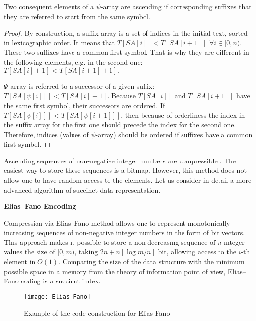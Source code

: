 \begin{theorem}
 \label{lemma:1}
 Two consequent elements of a $\psi$-array are ascending if corresponding suffixes that they are referred to
 start from the same symbol.
\end{theorem}

\begin{proof}
    By construction, a suffix array is a set of indices in the initial text,
    sorted in lexicographic order. It means that $T[SA[i]] < T[SA[i + 1]]$
    $\forall i \in [0, n).$ These two suffixes have a common first symbol.
    That is why they are different in the following elements, e.g. in the second one:
    $T[SA[i] + 1] < T[SA[i + 1] + 1].$

    $\Psi$-array is referred to a successor of a given suffix: $T[SA[\psi[i]]] < T[SA[i] + 1].$
    Because $T[SA[i]]$ and $T[SA[i + 1]]$ have the same first symbol, their successors are ordered.
    If $T[SA[\psi[i]]] < T[SA[\psi[i + 1]]]$, then because of orderliness the index in the suffix array
    for the first one should precede the index for the second one. Therefore, indices (values of $\psi$-array)
    should be ordered if suffixes have a common first symbol.
\end{proof}

Ascending sequences of non-negative integer numbers are compressible \cite{andersensimple}.
The easiest way to store these sequences is a bitmap.
However, this method does not allow one to have random access to the elements.
Let us consider in detail a more advanced algorithm of succinct data representation.

\textbf{Elias--Fano Encoding}

Compression via Elias--Fano method \cite{pibiri2014dynamic}
allows one to represent monotonically increasing sequences
of non-negative integer numbers in the form of bit vectors. This approach makes it possible to
store a non-decreasing sequence of $n$ integer values the size of $[0, m)$,
taking $2n + n[\log m/n]$ bit, allowing access to the $i$-th element in $O(1)$.
Comparing the size of the data structure with the minimum possible space in a memory
from the theory of information point of view, Elias--Fano coding is a succinct index.

\begin{figure}[t]
 \texttt{[image: Elias-Fano]}
 \caption{Example of the code construction for Elias-Fano}
 \centering
 \label{fig:EF}
\end{figure}

